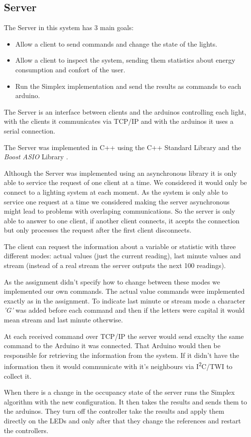 \subsection{Server}
\label{sec:Server}

The Server in this system has 3 main goals:
\begin{itemize}
    \item Allow a client to send commands and change the state of the lights.
    \item Allow a client to inspect the system, sending them statistics about energy consumption and confort of the user.
    \item Run the Simplex implementation and send the results as commands to each arduino.
\end{itemize}

The Server is an interface between clients and the arduinos controlling each light, with the clients it communicates via TCP/IP and with the arduinos it uses a serial connection.

The Server was implemented in C++ using the C++ Standard Library and the \emph{Boost ASIO} Library \cite{BoostSite}.

Although the Server was implemented using an asynchronous library it is only able to service the request of one client at a time.
We considered it would only be connect to a lighting system at each moment.
As the system is only able to service one request at a time we considered making the server asynchronous might lead to problems with overlaping communications.
So the server is only able to answer to one client, if another client connects, it acepts the connection but only processes the request after the first client disconnects.

The client can request the information about a variable or statistic with three different modes: actual values (just the current reading), last minute values and stream (instead of a real stream the server outputs the next 100 readings).

As the assignment didn't specify how to change between these modes we implemented our own commands. The actual value commands were implemented exactly as in the assignment.
To indicate last minute or stream mode a character \emph{'G'} was added before each command and then if the letters were capital it would mean stream and last minute otherwise.

At each received command over TCP/IP the server would send exaclty the same command to the Arduino it was connected. That Arduino would then be responsible for retrieving the information from the system. If it didn't have the information then it would communicate with it's neighbours via  I\textsuperscript{2}C/TWI to collect it.

When there is a change in the occupancy state of the server runs the Simplex algorithm with the new configuration. It then takes the results and sends them to the arduinos. They turn off the controller take the results and apply them directly on the LEDs and only after that they change the references and restart the controllers.
